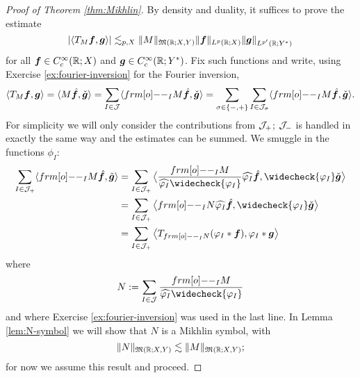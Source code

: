 \begin{proof}[Proof of Theorem \ref{thm:Mikhlin}]
  By density and duality, it suffices to prove the estimate
  \begin{equation*}
    |\langle T_{M} \bm{f}, \bm{g} \rangle| \lesssim_{p,X} \|M\|_{\mathfrak{M}(\mathbb{R};X,Y)} \|\bm{f}\|_{L^p(\mathbb{R};X)} \|\bm{g}\|_{L^{p'}(\mathbb{R};Y^{*})}
  \end{equation*}
  for all $\bm{f} \in C_{c}^\infty(\mathbb{R};X)$ and $\bm{g} \in C_{c}^\infty(\mathbb{R};Y^*)$.
  Fix such functions and write, using Exercise \ref{ex:fourier-inversion} for the Fourier inversion,
  \begin{equation*}
    \langle T_{M} \mb{f}, \mb{g} \rangle
    = \langle M\hat{\mb{f}}, \check{\mb{g}} \rangle
    = \sum_{I \in \mc{J}} \langle \1_{I} M\hat{\mb{f}}, \check{\mb{g}} \rangle
    = \sum_{\sigma \in \{-,+\}} \sum_{I \in \mc{J}_{\sigma}} \langle \1_{I} M\hat{\mb{f}}, \check{\mb{g}} \rangle.
  \end{equation*}
  For simplicity we will only consider the contributions from $\mathcal{J}_{+}$; $\mathcal{J}_{-}$ is handled in exactly the same way and the estimates can be summed.
  We smuggle in the functions $\phi_{I}$:
  \begin{equation*}
    \begin{aligned}
    \sum_{I \in \mc{J}_{+}} \langle \1_{I} M\hat{\mb{f}}, \check{\mb{g}} \rangle
    &= \sum_{I \in \mc{J}_{+}} \big\langle \frac{\1_{I} M}{\widehat{\phi_{I}} \widecheck{\phi_{I}}} \widehat{\phi_{I}} \hat{\mb{f}}, \widecheck{\phi_{I}} \check{\mb{g}} \big\rangle \\
    &= \sum_{I \in \mc{J}_{+}} \big\langle \1_{I} N \widehat{\phi_{I}} \hat{\mb{f}}, \widecheck{\phi_{I}} \check{\mb{g}} \big\rangle \\
    &=\sum_{I \in \mc{J}_{+}} \big\langle T_{\1_{I} N} (\phi_{I} \ast \mb{f}) , \phi_{I} \ast \mb{g} \big\rangle
  \end{aligned}
  \end{equation*}
where
\begin{equation*}
  N := \sum_{I \in \mc{J}} \frac{\1_{I} M}{\widehat{\phi_{I}} \widecheck{\phi_{I}}}
\end{equation*}
and where Exercise \ref{ex:fourier-inversion} was used in the last line.
In Lemma \ref{lem:N-symbol} we will show that $N$ is a Mikhlin symbol, with
\begin{equation}\label{eq:N-bound}
  \|N\|_{\mathfrak{M}(\mathbb{R};X,Y)} \lesssim \|M\|_{\mathfrak{M}(\mathbb{R};X,Y)};
\end{equation}
for now we assume this result and proceed.

\end{proof}

